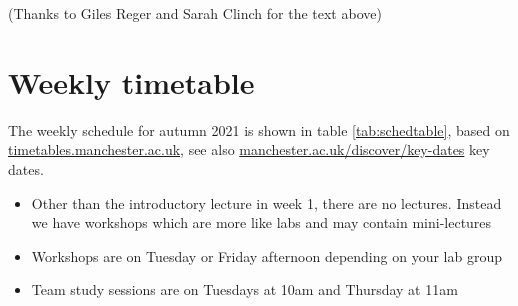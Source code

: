 \documentclass[
]{book}
\providecommand{\tightlist}{%
  \setlength{\itemsep}{0pt}\setlength{\parskip}{0pt}}
\begin{document}
(Thanks to Giles Reger and Sarah Clinch for the text above)

\hypertarget{timetabling}{%
\chapter*{Weekly timetable}\label{timetabling}}

The weekly schedule for autumn 2021 is shown in table \ref{tab:schedtable}, based on \href{https://timetables.manchester.ac.uk/}{timetables.manchester.ac.uk}, see also \href{https://www.manchester.ac.uk/discover/key-dates/}{manchester.ac.uk/discover/key-dates} key dates.

\begin{itemize}
\tightlist
\item
  Other than the introductory lecture in week 1, there are no lectures. Instead we have workshops which are more like labs and may contain mini-lectures
\item
  Workshops are on Tuesday or Friday afternoon depending on your lab group
\item
  Team study sessions are on Tuesdays at 10am and Thursday at 11am
\end{itemize}
\end{document}
